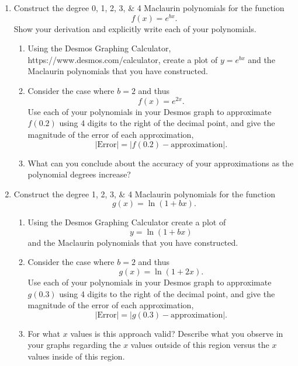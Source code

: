 \documentclass[12pt]{article}
\begin{document}
\begin{enumerate}
	\item Construct the degree 0, 1, 2, 3, \& 4 Maclaurin polynomials for the function 
\begin{equation}
	\displaystyle f(x) = e^{bx}.
\end{equation}  Show your derivation and explicitly write each of your polynomials.

 
	\begin{enumerate}
		\item Using the Desmos Graphing Calculator, https://www.desmos.com/calculator, create a plot of 
$y=e^{bx} $ and the Maclaurin polynomials that you have constructed. 


		\item Consider the case where $b=2$ and thus
\begin{equation}
	f(x)=e^{2x}.
\end{equation}
 Use each of your polynomials in your Desmos graph to approximate $f(0.2)$ using 4 digits to the right of the decimal point, and give the magnitude of the error of each approximation, 
\begin{equation}
	|\textrm{Error}| = |f(0.2) - \textrm{approximation}|.
\end{equation}

		\item What can you conclude about the accuracy of your approximations as the polynomial degrees increase?
		\end{enumerate}
	
	
\pagebreak	

	\item Construct the degree 1, 2, 3, \& 4 Maclaurin polynomials for the function 
\begin{equation}
	g(x) = \ln(1+bx).
\end{equation}

	\begin{enumerate}
		\item Using the Desmos Graphing Calculator create a plot of $$\displaystyle y= \ln(1+bx)$$ and the Maclaurin polynomials that you have constructed. 
		\item Consider the case where $b=2$ and thus
\begin{equation}
	g(x)=\ln(1+2x).
\end{equation}
Use each of your polynomials in your Desmos graph to approximate $\displaystyle g(0.3)$ using 4 digits to the right of the decimal point, and give the magnitude of the error of each approximation,
\begin{equation}
	|\textrm{Error}| = |g(0.3) - \textrm{approximation}|.
\end{equation}
		\item For what $x$ values is this approach valid?  Describe what you observe in your graphs regarding the $x$ values outside of this region versus the $x$ values inside of this region.


	\end{enumerate}		
	
	
	
\end{enumerate}
\end{document}
